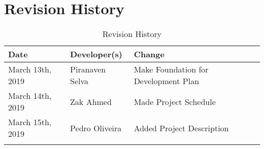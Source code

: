 \documentclass{article}
\begin{document}
\newpage
\section{Revision History}
\begin{table}[hp]
\caption{Revision History} \label{TblRevisionHistory}
\begin{tabularx}{\textwidth}{llX}
\toprule
\textbf{Date} & \textbf{Developer(s)} & \textbf{Change}\\
\midrule
March 13th, 2019 &Piranaven Selva & Make Foundation for Development Plan\\
March 14th, 2019 &Zak Ahmed & Made Project Schedule\\
March 15th, 2019 &Pedro Oliveira & Added Project Description\\
\\
\bottomrule
\end{tabularx}
\end{table}
\end{document}
